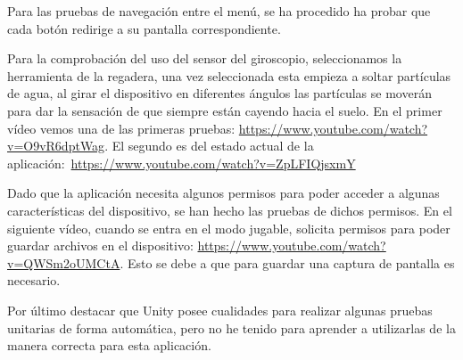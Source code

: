 Para las pruebas de navegación entre el menú, se ha procedido ha probar que cada botón redirige a su pantalla correspondiente.

Para la comprobación del uso del sensor del giroscopio, seleccionamos la herramienta de la regadera, una vez seleccionada esta empieza a soltar partículas de agua, al girar el dispositivo en diferentes ángulos las partículas se moverán para dar la sensación de que siempre están cayendo hacia el suelo. En el primer vídeo vemos una de las primeras pruebas: \url{https://www.youtube.com/watch?v=O9vR6dptWag}. El segundo es del estado actual de la aplicación:~\url{https://www.youtube.com/watch?v=ZpLFIQjsxmY}


Dado que la aplicación necesita algunos permisos para poder acceder a algunas características del dispositivo, se han hecho las pruebas de dichos permisos. En el siguiente vídeo, cuando se entra en el modo jugable, solicita permisos para poder guardar archivos en el dispositivo: \url{https://www.youtube.com/watch?v=QWSm2oUMCtA}. Esto se debe a que para guardar una captura de pantalla es necesario.




Por último destacar que Unity posee cualidades para realizar algunas pruebas unitarias de forma automática, pero no he tenido para aprender a utilizarlas de la manera correcta para esta aplicación. 